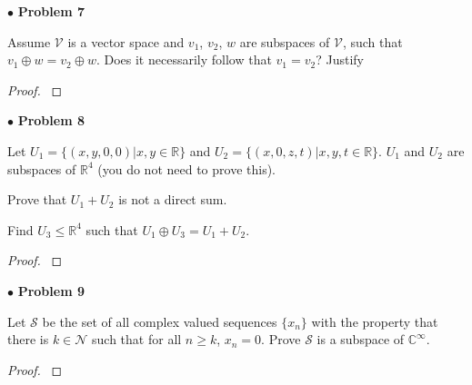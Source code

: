 \documentclass{article}
\begin{document}
\newpage
$\bullet$ \textbf{Problem 7}
\medskip

\begin{itshape}
Assume $\mathcal{V}$ is a vector space and $v_{1}$, $v_{2}$, $w$ are subspaces of $\mathcal{V}$, such that $v_{1} \oplus w = v_{2} \oplus w$. Does it necessarily follow that $v_{1}=v_{2}$? Justify
\end{itshape}
\medskip

\begin{proof}
$ $ \newline
\end{proof}


\newpage
$\bullet$ \textbf{Problem 8}
\medskip

\begin{itshape}
Let $U_{1} = \{ (x,y,0,0) | x, y \in \mathbb{R} \}$ and $U_{2} = \{ (x,0,z,t) | x, y, t \in \mathbb{R} \}$. $U_{1}$ and $U_{2}$ are subspaces of $\mathbb{R}^4$ (you do not need to prove this).

Prove that $U_{1} + U_{2}$ is not a direct sum.

Find $U_{3} \le \mathbb{R}^4$ such that $U_{1} \oplus U_{3} = U_{1} + U_{2}$.
\end{itshape}
\medskip

\begin{proof}
$ $ \newline
\end{proof}


\newpage
$\bullet$ \textbf{Problem 9}
\medskip

\begin{itshape}
Let $\mathcal{S}$ be the set of all complex valued sequences $\{ x_{n} \}$ with the property that there is $k \in \mathcal{N}$ such that for all $n \ge k$, $x_{n} = 0$. Prove $\mathcal{S}$ is a subspace of $\mathbb{C}^\infty$.
\end{itshape}
\medskip

\begin{proof}
$ $ \newline
\end{proof}
\end{document}
